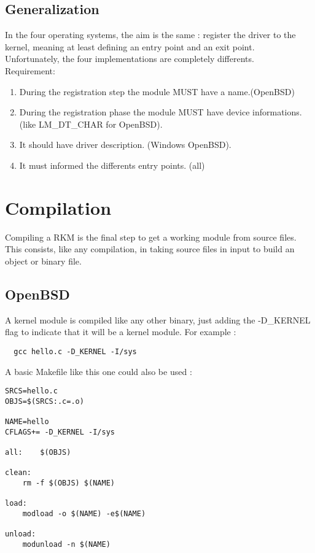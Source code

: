 \documentclass[11pt]{report}
\begin{document}
  \subsection{Generalization}
In the four operating systems, the aim is the same : register the driver to the
kernel, meaning at least defining an entry point and an exit point.\\
Unfortunately, the four implementations are completely differents.\\
Requirement:
  \begin{enumerate}
	\item During the registration step the module MUST have a name.(OpenBSD) 
	\item During the registration phase the module MUST have device informations.(like LM\_DT\_CHAR for OpenBSD).
	\item It should have driver description. (Windows OpenBSD).
	\item It must informed the differents entry points. (all)
  \end{enumerate}


\newpage
\section{Compilation}
Compiling a RKM is the final step to get a working module from source files.
This consists, like any compilation, in taking source files in input to build an
object or binary file.
  \subsection{OpenBSD}
  A kernel module is compiled like any other binary, just adding
  the -D\_KERNEL flag to indicate that it will be a kernel module.
  For example :
  \begin{lstlisting}
  gcc hello.c -D_KERNEL -I/sys
  \end{lstlisting}
  A basic Makefile like this one could also be used :
    \begin{lstlisting}
SRCS=hello.c
OBJS=$(SRCS:.c=.o)

NAME=hello
CFLAGS+= -D_KERNEL -I/sys

all:	$(OBJS)

clean:
	rm -f $(OBJS) $(NAME)

load:
	modload -o $(NAME) -e$(NAME)

unload:
	modunload -n $(NAME)
    \end{lstlisting}
\end{document}
